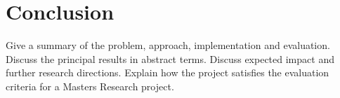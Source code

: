\chapter{Conclusion}
Give a summary of the problem, approach, implementation and evaluation. Discuss the principal
results in abstract terms. Discuss expected impact and further research directions.
Explain how the project satisfies the evaluation criteria for a Masters Research project. 